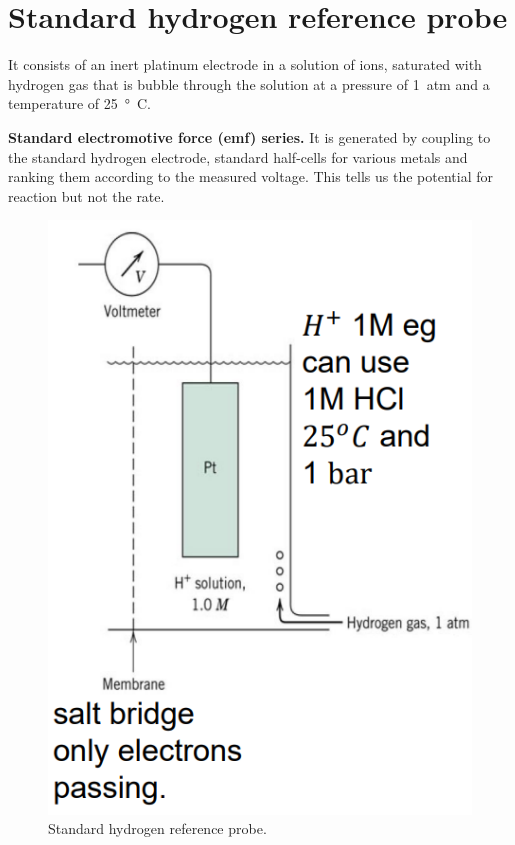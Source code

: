 \section{Standard hydrogen reference probe}
It consists of an inert platinum electrode in a  solution of  ions, saturated with hydrogen gas that is bubble through the solution at a pressure of \SI{1}{atm} and a temperature of \SI{25}{\degree C}.

\textbf{Standard electromotive force (emf) series.} It is generated by coupling to the standard hydrogen electrode, standard half-cells for various metals and ranking them according to the measured voltage. This tells us the potential for reaction but not the rate.
\begin{figure}[H]
    \centering
    \includegraphics[width = 0.5 \textwidth]{img/figure72.png}
    \caption{Standard hydrogen reference probe.}
\end{figure}